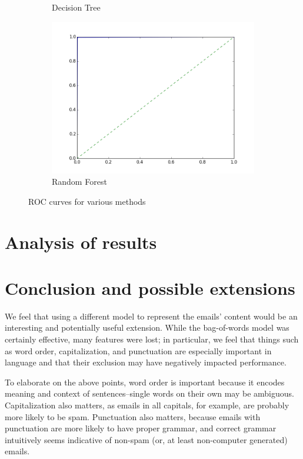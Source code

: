 \documentclass{article} %
\begin{document}
\begin{figure}[p]
\begin{subfigure}{0.45\textwidth}
    \caption{Decision Tree}
  \end{subfigure}
  \begin{subfigure}{0.45\textwidth}
    \includegraphics[width=\textwidth]{random_forest_roc_curve.png}
    \caption{Random Forest}
  \end{subfigure}
  \caption{ROC curves for various methods}
  \label{fig:roc}
\end{figure}

\section{Analysis of results}

\section{Conclusion and possible extensions}

We feel that using a different model to represent the emails' content would be an interesting and potentially useful extension. While the bag-of-words model was certainly effective, many features were lost; in particular, we feel that things such as word order, capitalization, and punctuation are especially important in language and that their exclusion may have negatively impacted performance. 

To elaborate on the above points, word order is important because it encodes meaning and context of sentences--single words on their own may be ambiguous. Capitalization also matters, as emails in all capitals, for example, are probably more likely to be spam. Punctuation also matters, because emails with punctuation are more likely to have proper grammar, and correct grammar intuitively seems indicative of non-spam (or, at least non-computer generated) emails. 
\end{document}
